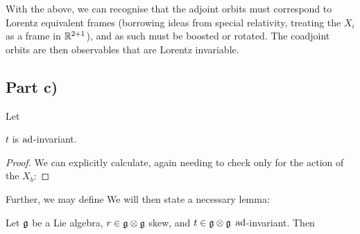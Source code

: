 \documentclass{article}
\begin{document}
With the above, we can recognise that the adjoint orbits must correspond to Lorentz equivalent frames (borrowing ideas from special relativity, treating the $X_i$ as a frame in $\mathbb{R}^{2+1}$), and as such must be boosted or rotated. The coadjoint orbits are then observables that are Lorentz invariable. 

\subsection{Part c)}
Let 

\begin{prop}
$t$ is $\operatorname{ad}$-invariant.
\end{prop}
\begin{proof}
We can explicitly calculate, again needing to check only for the action of the  $X_b$:
\end{proof}

Further, we may define 
We will then state a necessary lemma:

\begin{lemma}
Let $\mathfrak{g}$ be a Lie algebra, $r \in \mathfrak{g} \otimes \mathfrak{g}$ skew, and $t \in \mathfrak{g} \otimes \mathfrak{g}$ $\operatorname{ad}$-invariant. Then 
\end{lemma}
\end{document}
